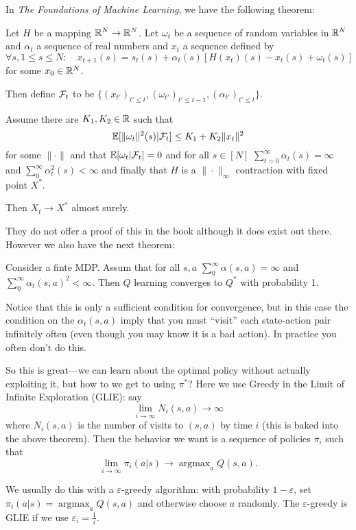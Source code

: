 \documentclass[12pt]{article}
\DeclareMathOperator*{\argmax}{argmax}
\begin{document}
In \textit{The Foundations of Machine Learning}, we have the following theorem:
\begin{thm}
	Let $H$ be a mapping $\mathbb{R}^N\to \mathbb{R}^N$. Let $\omega_t$ be a sequence of random variables in $\mathbb{R}^N$ and $\alpha_t$ a sequence of real numbers and $x_t$ a sequence defined by 
	\[\forall s, 1\le s\le N:\quad x_{t+1}(s)=s_t(s)+\alpha_t(s)[H(x_t)(s)-x_t(s)+\omega_t(s)]\]
	for some $x_0\in \mathbb{R}^N$. 

	Then define $\mathcal{F}_t$ to be $\{(x_{t'})_{t'\le t},(\omega_{t'})_{t'\le t-1}, (\alpha_{t'})_{t'\le t}\}$.

	Assume there are $K_1,K_2\in\mathbb{R}$ such that 
	\[\mathbb{E}[\|\omega_t\|^2(s)|\mathcal{F}_t]\le K_1+K_2\|x_t\|^2\]
	for some $\|\cdot\|$ and that $\mathbb{E}[\omega_t|\mathcal{F}_t]=0$ and for all $s\in[N]$ $\sum_{t=0}^\infty \alpha_t(s)=\infty$ and $\sum_0^\infty \alpha_t^2(s)<\infty$ and finally that $H$ is a $\|\cdot\|_\infty$ contraction with fixed point $X^\ast$.

	Then $X_t\to X^\ast$ almost surely.
\end{thm}
They do not offer a proof of this in the book although it does exist out there. However we also have the next theorem:
\begin{thm}
	Consider a finte MDP. Assum that for all $s,a$ $\sum_0^\infty \alpha(s,a)=\infty$ and $\sum_0^\infty \alpha_t(s,a)^2<\infty$. Then $Q$ learning converges to $Q^\ast$ with probability 1.
\end{thm}
\begin{rmk}
	Notice that this is only a sufficient condition for convergence, but in this case the condition on the $\alpha_t(s,a)$ imply that you must ``visit'' each state-action pair infinitely often (even though you may know it is a bad action).
	In practice you often don't do this.
\end{rmk}

So this is great---we can learn about the optimal policy without actually exploiting it, but how to we get to using $\pi^\ast$? Here we use Greedy in the Limit of Infinite Exploration (GLIE): say
\[\lim_{i\to\infty}N_i(s,a)\to\infty\]
where $N_i(s,a)$ is the number of visits to $(s,a)$ by time $i$ (this is baked into the above theorem). Then the behavior we want is a sequence of policies $\pi_i$ such that
\[\lim_{i\to\infty}\pi_i(a|s)\to\argmax_aQ(s,a).\]

We usually do this with a $\varepsilon$-greedy algorithm: with probability $1-\varepsilon$, set $\pi_i(a|s)=\argmax_aQ(s,a)$ and otherwise choose $a$ randomly. The $\varepsilon$-greedy is GLIE if we use $\varepsilon_i=\frac{1}{i}.$
\end{document}
